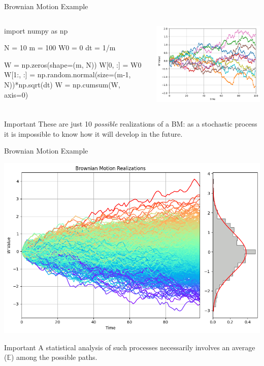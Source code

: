\documentclass{beamer}
\begin{document}
\begin{frame}[fragile]{Brownian Motion Example}
\begin{columns}
\begin{ipython}
import numpy as np

N = 10
m = 100
W0 = 0
dt = 1/m

W = np.zeros(shape=(m, N))
W[0, :] = W0
W[1:, :] = np.random.normal(size=(m-1, N))*np.sqrt(dt)
W = np.cumsum(W, axis=0)
\end{ipython}
\begin{center}    
    \includegraphics[width=1.\linewidth]{images/bm_realizations}
\end{center}
\end{columns}
\begin{block}{Important}
These are just 10 \emph{possible} realizations of a BM: as a stochastic process it is impossible to know how it will develop in the future.
\end{block}
\end{frame}

\begin{frame}[fragile]{Brownian Motion Example}
	\begin{center}    
		\includegraphics[width=0.5\linewidth]{images/bm_realizations_density}
	\end{center}
\begin{block}{Important}
A statistical analysis of such processes necessarily involves an average ($\mathbb{E}$) among the possible paths.
\end{block}
\end{frame}
\end{document}
